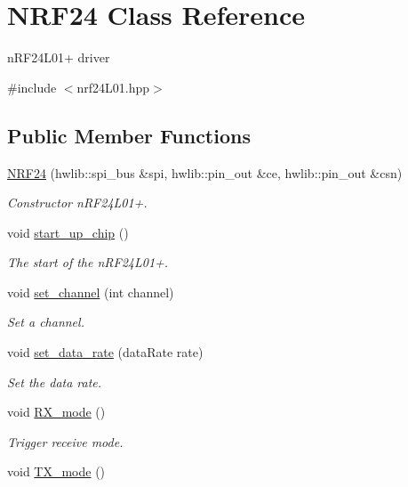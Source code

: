 \hypertarget{classNRF24}{}\section{N\+R\+F24 Class Reference}
\label{classNRF24}


n\+R\+F24\+L01+ driver  




{\ttfamily \#include $<$nrf24\+L01.\+hpp$>$}

\subsection*{Public Member Functions}
\begin{DoxyCompactItemize}
\item 
\hyperlink{classNRF24_a09269e76d1390baf00cc06d8f99ae422}{N\+R\+F24} (hwlib\+::spi\+\_\+bus \&spi, hwlib\+::pin\+\_\+out \&ce, hwlib\+::pin\+\_\+out \&csn)
\begin{DoxyCompactList}\small\item\em Constructor n\+R\+F24\+L01+. \end{DoxyCompactList}\item 
void \hyperlink{classNRF24_a74955df5f940b99709ddea27cfd5422e}{start\+\_\+up\+\_\+chip} ()
\begin{DoxyCompactList}\small\item\em The start of the n\+R\+F24\+L01+. \end{DoxyCompactList}\item 
void \hyperlink{classNRF24_a300f0a27471f25d498809799161d811f}{set\+\_\+channel} (int channel)
\begin{DoxyCompactList}\small\item\em Set a channel. \end{DoxyCompactList}\item 
void \hyperlink{classNRF24_a57ed330144bf0fd0f72ace57cc0a63bc}{set\+\_\+data\+\_\+rate} (data\+Rate rate)
\begin{DoxyCompactList}\small\item\em Set the data rate. \end{DoxyCompactList}\item 
void \hyperlink{classNRF24_a073930d0c3f900010309670712acc677}{R\+X\+\_\+mode} ()
\begin{DoxyCompactList}\small\item\em Trigger receive mode. \end{DoxyCompactList}\item 
void \hyperlink{classNRF24_aacd402b288514cc6c601b4041dab27d3}{T\+X\+\_\+mode} ()

\end{DoxyCompactItemize}
